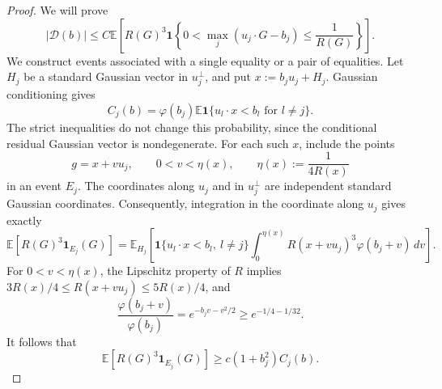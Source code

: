 \documentclass[11pt,letterpaper]{article}
\theoremstyle{remark}
\newcommand{\E}{\mathbb E}
\newcommand{\ind}{\mathbf 1}
\begin{document}
\begin{proof}
We will prove
\begin{equation}
 |\mathcal D(b)|
 \le C\E\left[
 R(G)^3\ind\left\{0<\max_j(u_j\cdot G-b_j)\le\frac1{R(G)}\right\}
 \right].
 \label{appx-an:adaptive-layer}
\end{equation}
We construct events associated with a single equality or a pair
of equalities. Let \(H_j\) be a standard Gaussian vector in
\(u_j^\perp\), and put \(x:=b_ju_j+H_j\).
Gaussian conditioning gives
\begin{equation}
 C_j(b)=\varphi(b_j)
       \E\ind\{u_l\cdot x<b_l\text{ for }l\ne j\}.
 \label{appx-an:one-density}
\end{equation}
The strict inequalities do not change this probability, since the
conditional residual Gaussian vector is nondegenerate.
For each such \(x\), include the points
\[
 g=x+v u_j,\qquad 0<v<\eta(x),\qquad
 \eta(x):=\frac1{4R(x)}
\]
in an event \(E_j\).
The coordinates along \(u_j\) and in \(u_j^\perp\) are independent
standard Gaussian coordinates. Consequently, integration in the
coordinate along \(u_j\) gives exactly
\[
 \E[R(G)^3\ind_{E_j}(G)]
 =\E_{H_j}\left[\ind\{u_l\cdot x<b_l,\ l\ne j\}
   \int_0^{\eta(x)}R(x+vu_j)^3\varphi(b_j+v)\,dv\right].
\]
For \(0<v<\eta(x)\), the Lipschitz property of \(R\) implies
\(3R(x)/4\le R(x+vu_j)\le5R(x)/4\), and
\[
 \frac{\varphi(b_j+v)}{\varphi(b_j)}
 =e^{-b_jv-v^2/2}\ge e^{-1/4-1/32}.
\]
It follows that
\begin{equation}
 \E[R(G)^3\ind_{E_j}(G)]
 \ge c(1+b_j^2)C_j(b).
 \label{appx-an:one-region}
\end{equation}


\end{proof}
\end{document}
